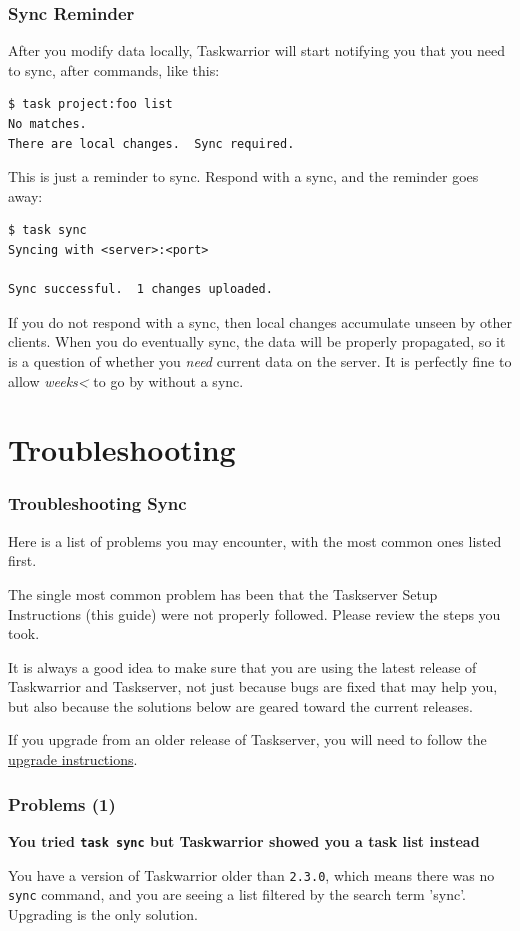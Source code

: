\documentclass[t,handout]{beamer}
\begin{document}
\begin{frame}[fragile]\frametitle{Sync Reminder}
    \vfill
    After you modify data locally, Taskwarrior will start notifying you that you need to sync, after commands, like this:

    \begin{lstlisting}
$ task project:foo list
No matches.
There are local changes.  Sync required.\end{lstlisting}

    This is just a reminder to sync. Respond with a sync, and the reminder goes away:

    \begin{lstlisting}
$ task sync
Syncing with <server>:<port>

Sync successful.  1 changes uploaded.\end{lstlisting}

    If you do not respond with a sync, then local changes accumulate unseen by other clients. When you do eventually sync, the data will be properly propagated, so it is a question of whether you \emph{need} current data on the server. It is perfectly fine to allow \emph{weeks<} to go by without a sync.
\end{frame}

\section{Troubleshooting}

\begin{frame}[fragile]\frametitle{Troubleshooting Sync}
    \vfill
    Here is a list of problems you may encounter, with the most common ones listed first.

    The single most common problem has been that the Taskserver Setup Instructions (this guide) were not properly followed.  Please review the steps you took.

    It is always a good idea to make sure that you are using the latest release of Taskwarrior and Taskserver, not just because bugs are fixed that may help you, but also because the solutions below are geared toward the current releases.

    If you upgrade from an older release of Taskserver, you will need to follow the \href{http://taskwarrior.org/docs/taskserver/upgrade.html}{upgrade instructions}.
\end{frame}

\begin{frame}[fragile]\frametitle{Problems (1)}
    \vfill
    \textbf{You tried \texttt{task sync} but Taskwarrior showed you a task list instead}

    You have a version of Taskwarrior older than \verb+2.3.0+, which means there was no \verb+sync+ command, and you are seeing a list filtered by the search term 'sync'. Upgrading is the only solution.
\end{frame}
\end{document}
